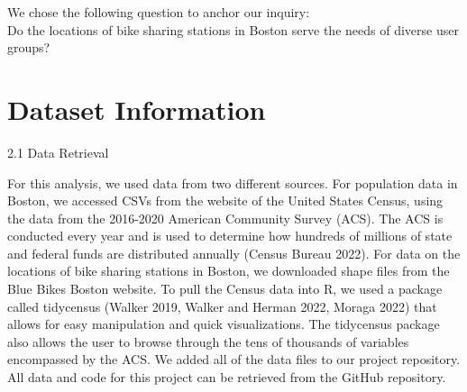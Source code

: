 \documentclass[
  12pt,
]{article}
\begin{document}
We chose the following question to anchor our inquiry:\\
Do the locations of bike sharing stations in Boston serve the needs of
diverse user groups?

\newpage

\hypertarget{dataset-information}{%
\section{Dataset Information}\label{dataset-information}}

2.1 Data Retrieval

For this analysis, we used data from two different sources. For
population data in Boston, we accessed CSVs from the website of the
United States Census, using the data from the 2016-2020 American
Community Survey (ACS). The ACS is conducted every year and is used to
determine how hundreds of millions of state and federal funds are
distributed annually (Census Bureau 2022). For data on the locations of
bike sharing stations in Boston, we downloaded shape files from the Blue
Bikes Boston website. To pull the Census data into R, we used a package
called tidycensus (Walker 2019, Walker and Herman 2022, Moraga 2022)
that allows for easy manipulation and quick visualizations. The
tidycensus package also allows the user to browse through the tens of
thousands of variables encompassed by the ACS. We added all of the data
files to our project repository. All data and code for this project can
be retrieved from the GitHub repository.
\end{document}
